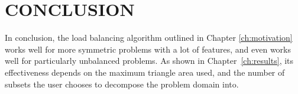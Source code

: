 \chapter{\uppercase {Conclusion}}

In conclusion, the load balancing algorithm outlined in Chapter \ref{ch:motivation} works well for more symmetric problems with a lot of features, and even works well for particularly unbalanced problems. As shown in Chapter~\ref{ch:results}, its effectiveness depends on the maximum triangle area used, and the number of subsets the user chooses to decompose the problem domain into. 

